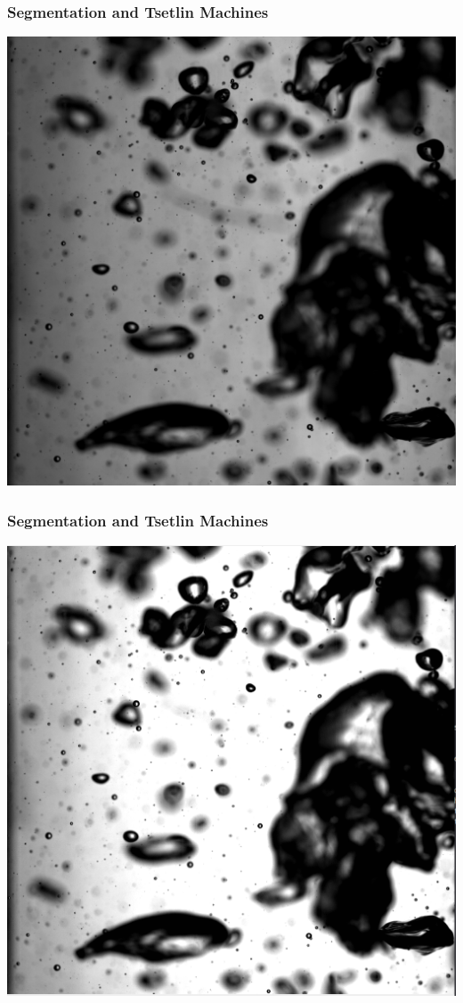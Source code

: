 \documentclass{beamer}
\begin{document}
\begin{frame}
    \frametitle{Segmentation and Tsetlin Machines}
    \begin{center}
        \includegraphics[width=0.8\columnwidth]{orig-img}
    \end{center}
\end{frame}

\begin{frame}
    \frametitle{Segmentation and Tsetlin Machines}
    \begin{center}
        \includegraphics[width=0.8\columnwidth]{adjusted-contrast}
    \end{center}
\end{frame}
\end{document}
